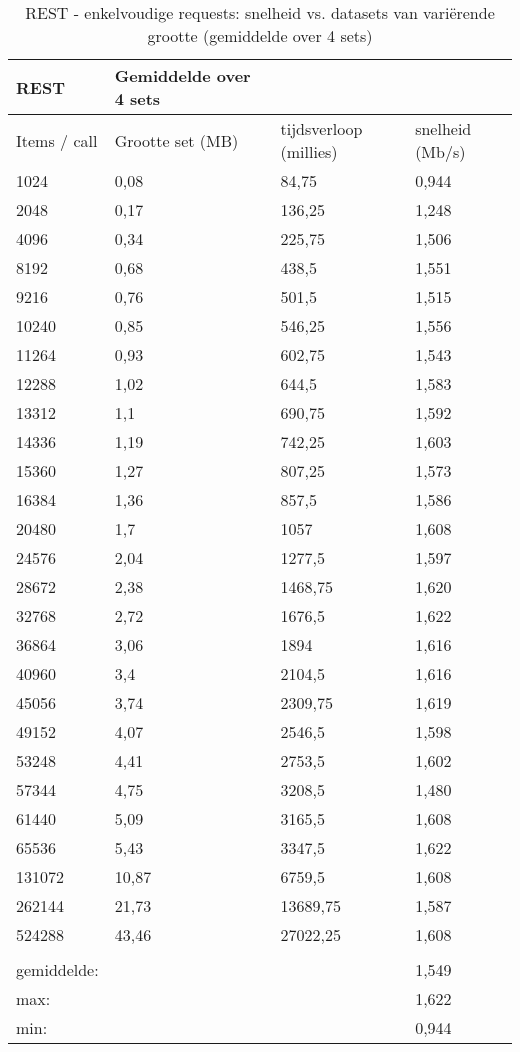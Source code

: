 \begin{table}
    \centering
    \begin{tabular}{llll}
        \toprule
        \textbf{REST} & {Gemiddelde over 4 sets} & & \\
        \midrule
        Items / call & Grootte set (MB) & tijdsverloop (millies) & snelheid (Mb/s) \\
        1024 & 0,08 & 84,75 & 0,944 \\
        2048 & 0,17 & 136,25 & 1,248 \\
        4096 & 0,34 & 225,75 & 1,506 \\
        8192 & 0,68 & 438,5 & 1,551 \\
        9216 & 0,76 & 501,5 & 1,515 \\
        10240 & 0,85 & 546,25 & 1,556 \\
        11264 & 0,93 & 602,75 & 1,543 \\
        12288 & 1,02 & 644,5 & 1,583 \\
        13312 & 1,1 & 690,75 & 1,592 \\
        14336 & 1,19 & 742,25 & 1,603 \\
        15360 & 1,27 & 807,25 & 1,573 \\
        16384 & 1,36 & 857,5 & 1,586 \\
        20480 & 1,7 & 1057 & 1,608 \\
        24576 & 2,04 & 1277,5 & 1,597 \\
        28672 & 2,38 & 1468,75 & 1,620 \\
        32768 & 2,72 & 1676,5 & 1,622 \\
        36864 & 3,06 & 1894 & 1,616 \\
        40960 & 3,4 & 2104,5 & 1,616 \\
        45056 & 3,74 & 2309,75 & 1,619 \\
        49152 & 4,07 & 2546,5 & 1,598 \\
        53248 & 4,41 & 2753,5 & 1,602 \\
        57344 & 4,75 & 3208,5 & 1,480 \\
        61440 & 5,09 & 3165,5 & 1,608 \\
        65536 & 5,43 & 3347,5 & 1,622 \\
        131072 & 10,87 & 6759,5 & 1,608 \\
        262144 & 21,73 & 13689,75 & 1,587 \\
        524288 & 43,46 & 27022,25 & 1,608 \\
         &  &  &  \\
        gemiddelde: &  &  & 1,549 \\
        max: &  &  & 1,622 \\
        min: &  &  & 0,944 \\
        \bottomrule
    \end{tabular}
    \caption{REST - enkelvoudige requests: snelheid vs. datasets van vari\"erende grootte (gemiddelde over 4 sets)}
    \label{tab:RESTenkelvoudig}
\end{table}

